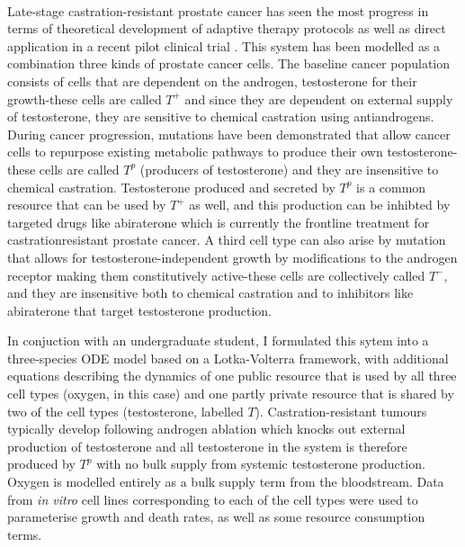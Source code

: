 \documentclass[12pt,onecolumn,twoside]{article}
\begin{document}
	\paragraph{\empty}Late-stage castration-resistant prostate cancer has seen the most progress in terms of theoretical development of adaptive therapy protocols \citep{Cunningham2018, West2018b, Jain2011} as well as direct application in a recent pilot clinical trial \citep{Zhang2017a}. This system has been modelled as a combination three kinds of prostate cancer cells. The baseline cancer population consists of cells that are dependent on the androgen, testosterone for their growth-these cells are called $T^+$ and since they are dependent on external supply of testosterone, they are sensitive to chemical castration using antiandrogens. During cancer progression, mutations have been demonstrated that allow cancer cells to repurpose existing metabolic pathways to produce their own testosterone-these cells are called $T^p$ (producers of testosterone) and they are insensitive to chemical castration. Testosterone produced and secreted by $T^p$ is a common resource that can be used by $T^+$ as well, and this production can be inhibted by targeted drugs like abiraterone which is currently the frontline treatment for castrationresistant prostate cancer. A third cell type can also arise by mutation that allows for testosterone-independent growth by modifications to the androgen receptor making them constitutively active-these cells are collectively called $T^-$, and they are insensitive both to chemical castration and to inhibitors like abiraterone that target testosterone production.

	In conjuction with an undergraduate student, I formulated this sytem into a three-species ODE model based on a Lotka-Volterra framework, with additional equations describing the dynamics of one public resource that is used by all three cell types (oxygen, in this case) and one partly private resource that is shared by two of the cell types (testosterone, labelled $T$). Castration-resistant tumours typically develop following androgen ablation which knocks out external production of testosterone and all testosterone in the system is therefore produced by $T^p$ with no bulk supply from systemic testosterone production. Oxygen is modelled entirely as a bulk supply term from the bloodstream. Data from \textit{in vitro} cell lines corresponding to each of the cell types were used to parameterise growth and death rates, as well as some resource consumption terms.\\
\end{document}
